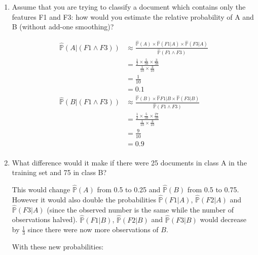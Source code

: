 \documentclass[10pt,\jkfside,a4paper]{article}
\begin{document}
\begin{enumerate}
\begin{enumerate}
\item Assume that you are trying to classify a document which contains only
the features F1 and F3: how would you estimate the relative probability
of A and B (without add-one smoothing)?

\begin{equation}
\begin{split}
\hat{\mathds{P}}(A|(F1\wedge F3)) &\approx \frac{\hat{\mathds{P}}(A) \times \hat{\mathds{P}}(F1|A) \times \hat{\mathds{P}}(F3|A)}{\hat{\mathds{P}}(F1\wedge F3)}\\
							&= \frac{\frac{1}{2} \times \frac{5}{50} \times \frac{3}{50}}{\frac{1}{10}\times \frac{3}{10}}\\
							&= \frac{1}{10}\\
							&= 0.1\\
\hat{\mathds{P}}(B|(F1\wedge F3)) &\approx \frac{\hat{\mathds{P}}(B) \times \hat{\mathds{P}}{F1|B} \times \hat{\mathds{P}}(F3|B)}{\hat{\mathds{P}}(F1\wedge F3)}\\
							&= \frac{\frac{1}{2} \times \frac{5}{50} \times \frac{27}{50}}{\frac{1}{10}\times \frac{3}{10}}\\
							&= \frac{9}{10}\\
							&= 0.9\\
\end{split}
\end{equation}

\item What difference would it make if there were 25 documents in class A in
the training set and 75 in class B?

This would change $\hat{\mathds{P}}(A)$ from 0.5 to 0.25 and $\hat{\mathds{P}}(B)$ from 0.5 to 0.75.\\
However it would also double the probabilities $\hat{\mathds{P}}(F1|A)$, 
$\hat{\mathds{P}}(F2|A)$ and $\hat{\mathds{P}}(F3|A)$ (since the observed number is the same while the 
number of observations halved). $\hat{\mathds{P}}(F1|B)$, $\hat{\mathds{P}}(F2|B)$ and $\hat{\mathds{P}}(F3|B)$ 
would decrease by $\frac{1}{3}$ since there were now more observations of $B$.

With these new probabilities:


\end{enumerate}
\end{enumerate}
\end{document}
